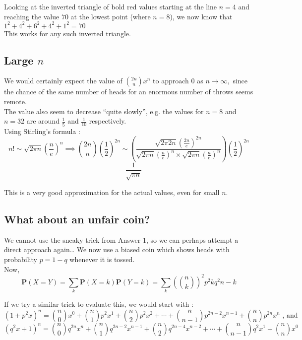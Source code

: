 \documentclass[a4paper,10pt]{article}
\begin{document}
\begin{flushleft}
Looking at the inverted triangle of bold red values starting at the line $n = 4$ and reaching the value $70$ at the lowest point (where $n=8$), we now know that \\
$1^2 + 4^2 + 6^2 + 4^2 + 1^2 = 70$ \\
This works for any such inverted triangle.  

\subsection{Large $n$}
We would certainly expect the value of $\binom{2n}{n} x^n$ to approach $0$ as $n \rightarrow \infty,$ since the chance of the same number of heads for an enormous number of throws seems remote. \\
The value also seem to decrease ``quite slowly'', e.g. the values for $n=8$ and $n=32$ are around $\frac{1}{5}$ and $\frac{1}{10}$ respectively. \\
Using Stirling's formula :     
\begin{equation*}
n!  \sim \sqrt{2 \pi n}(\frac{n}{e})^n \implies \binom{2n}{n}\left(\frac{1}{2}\right)^{2n} \sim \left(\frac{\sqrt{2 \pi 2n}(\frac{2n}{e})^{2n}}{\sqrt{2 \pi n}(\frac{n}{e})^n \times \sqrt{2 \pi n}(\frac{n}{e})^n}\right)\left(\frac{1}{2}\right)^{2n}
\end{equation*}
\begin{equation*}
= \frac{1}{\sqrt{\pi n}}
\end{equation*}

This is a very good approximation for the actual values, even for small $n$.

\subsection{What about an unfair coin?}
 
We cannot use the sneaky trick from Answer 1, so we can perhaps attempt a direct approach again\ldots
We now use a biased coin which shows heads with probability $p = 1 - q$ whenever it is tossed. \\

Now,
\begin{equation*}
\mathbf{P}(X = Y) = \sum_k \mathbf{P}(X = k)\mathbf{P}(Y = k) = 
 \sum_k \left(\binom{n}{k}\right)^2 p^2k q^2{n-k} 
\end{equation*}

If we try a similar trick to evaluate this, we would start with : 
\begin{equation*}
(1 +p^2 x)^n = \binom{n}{0}x^0 + \binom{n}{1}p^2x^1 + \binom{n}{2}p^2x^2 + \cdots + \binom{n}{n-1}p^{2n-2}x^{n-1} + \binom{n}{n}p^{2n}x^n  \text{ , and}   
\end{equation*}
\begin{equation*}
(q^2x + 1)^n = \binom{n}{0}q^{2n}x^n + \binom{n}{1}q^{2n-2}x^{n-1} + \binom{n}{2}q^{2n-4}x^{n-2} + \cdots + \binom{n}{n-1}q^2x^1 + \binom{n}{n}x^0   
\end{equation*}


\end{flushleft}
\end{document}
